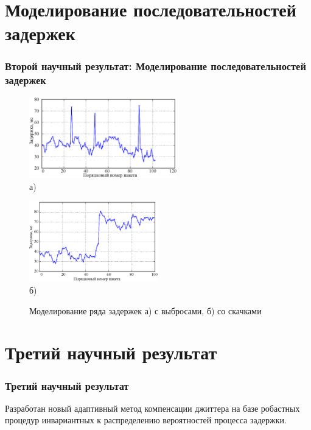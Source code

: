 \documentclass[10pt,pdf,hyperref={unicode}]{beamer}
\begin{document}
\section{Моделирование последовательностей задержек}
\begin{frame}
\frametitle{Второй научный результат: Моделирование последовательностей задержек}
\begin{figure} [h]
\begin{minipage}[h]{0.47\linewidth}
\center
\includegraphics[width=1\linewidth , height=3.5cm]{3chapter/3_1_a.eps} \\{\scriptsize а)} \\
\end{minipage}
\hfill
\begin{minipage}[h]{0.47\linewidth}
\center
\includegraphics[width=1\linewidth, height=3.5cm]{3chapter/3_1_b.eps} \\{\scriptsize б)} \\
\end{minipage}
\caption*{Моделирование ряда задержек а) с выбросами, б) со скачками}
\label{img3:modelJitter}
\end{figure}
\end{frame}


\section{Третий научный результат}

\begin{frame}
\frametitle{Третий научный результат}

{\Large Разработан новый адаптивный метод компенсации джиттера на базе робастных процедур инвариантных к распределению вероятностей процесса задержки.}

\end{frame}
\end{document}
